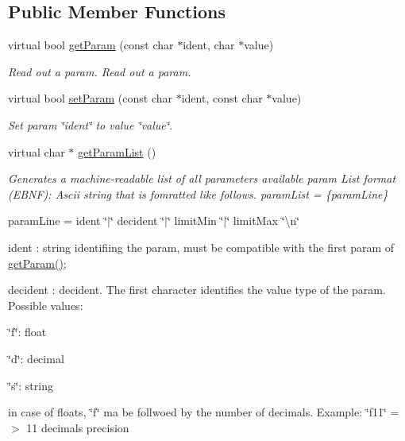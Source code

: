 \subsection*{Public Member Functions}
\begin{DoxyCompactItemize}
\item 
virtual bool \hyperlink{classgeneric_param_interface_a8d3d4123db419e649fe73adf4b498135}{get\-Param} (const char $\ast$ident, char $\ast$value)
\begin{DoxyCompactList}\small\item\em Read out a param. Read out a param. \end{DoxyCompactList}\item 
virtual bool \hyperlink{classgeneric_param_interface_aeb0cf7b216209f4514f5285c3d57f5fd}{set\-Param} (const char $\ast$ident, const char $\ast$value)
\begin{DoxyCompactList}\small\item\em Set param \char`\"{}ident\char`\"{} to value \char`\"{}value\char`\"{}. \end{DoxyCompactList}\item 
virtual char $\ast$ \hyperlink{classgeneric_param_interface_a10302cc5d418fff17ff222c2d74fc13d}{get\-Param\-List} ()
\begin{DoxyCompactList}\small\item\em Generates a machine-\/readable list of all parameters available param List format (E\-B\-N\-F)\-: Ascii string that is fomratted like follows. param\-List = \{param\-Line\}\par
 param\-Line = ident \char`\"{}$|$\char`\"{} decident \char`\"{}$|$\char`\"{} limit\-Min \char`\"{}$|$\char`\"{} limit\-Max \char`\"{}\textbackslash{}n\char`\"{}\par
 ident \-: string identifiing the param, must be compatible with the first param of \hyperlink{classgeneric_param_interface_a8d3d4123db419e649fe73adf4b498135}{get\-Param()};\par
 decident \-: decident. The first character identifies the value type of the param. Possible values\-:\par
 \char`\"{}f\char`\"{}\-: float\par
 \char`\"{}d\char`\"{}\-: decimal\par
 \char`\"{}s\char`\"{}\-: string\par
 in case of floats, \char`\"{}f\char`\"{} ma be follwoed by the number of decimals. Example\-: \char`\"{}f11\char`\"{} =$>$ 11 decimals precision\par

\end{DoxyCompactList}
\end{DoxyCompactItemize}
